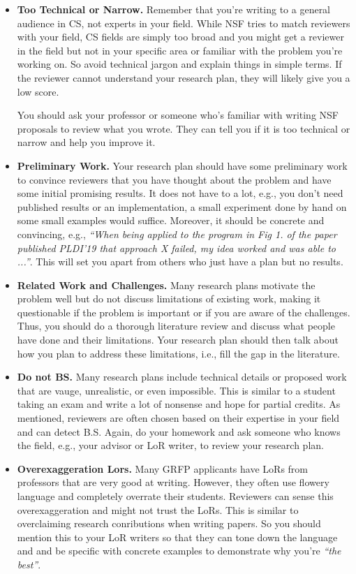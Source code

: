 \documentclass[oneside,11pt,dvipsnames]{book}
\begin{document}
\begin{itemize}

\item \textbf{Too Technical or Narrow.} Remember that you're writing to a general audience in CS, not experts in your field.  While NSF tries to match reviewers with your field, CS fields are simply too broad and you might get a reviewer in the field but not in your specific area or familiar with the problem you're working on.
So avoid technical jargon and explain things in simple terms. If the reviewer cannot understand your research plan, they will likely give you a low score.

You should ask your professor or someone who's familiar with writing NSF proposals to review what you wrote.  They can tell you if it is too technical or narrow and help you improve it.

\item \textbf{Preliminary Work.} Your research plan should have some preliminary work to convince reviewers that you have thought about the problem and have some initial promising results.  It does not have to a lot, e.g., you don't need published results or an implementation, a small experiment done by hand on some small examples would suffice.  Moreover, it should be concrete and convincing, e.g., \emph{``When being applied to the program in Fig 1. of the paper published PLDI'19 that approach X failed, my idea worked and was able to ...''}.  This will set you apart from others who just have a plan but no results.

\item \textbf{Related Work and Challenges.} Many research plans motivate the problem well but do not discuss limitations of existing work, making it questionable if the problem is important or if you are aware of the challenges.  Thus, you should do a thorough literature review and discuss what people have done and their limitations.  Your research plan should then talk about how you plan to address these limitations, i.e., fill the gap in the literature.  


\item \textbf{Do not BS.} Many research plans include technical details or proposed work that are vauge, unrealistic, or even impossible.  This is similar to a student taking an exam and write a lot of nonsense and hope for partial credits.  As mentioned, reviewers are often chosen based on their expertise in your field and can detect B.S. Again, do your homework and ask someone who knows the field, e.g., your advisor or LoR writer, to review your research plan.


\item \textbf{Overexaggeration Lors.} Many GRFP applicants have LoRs from professors that are very good at writing. However, they often use flowery language and completely overrate their students. Reviewers can sense this overexaggeration and might not trust the LoRs. This is similar to overclaiming research conributions when writing papers. 
So you should mention this to your LoR writers so that they can tone down the language and and be specific with concrete examples to demonstrate why you're \emph{``the best''}.

\end{itemize}
\end{document}
